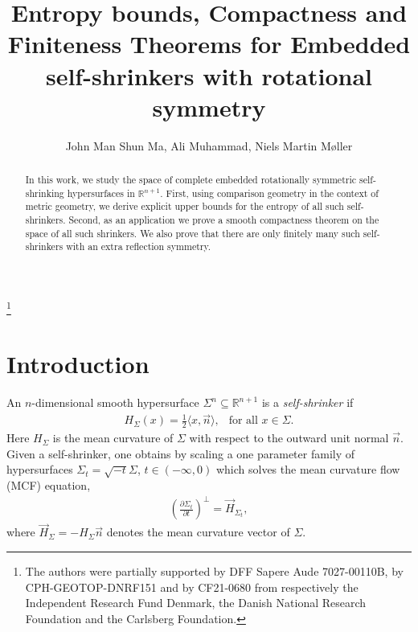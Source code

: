 \documentclass[12pt]{amsart}
\numberwithin{equation}{section}
\theoremstyle{remark}
\begin{document}
	
	\thanks{The authors were partially supported by DFF Sapere Aude 7027-00110B, by CPH-GEOTOP-DNRF151 and by CF21-0680 from respectively the Independent Research Fund Denmark, the Danish National Research Foundation and the Carlsberg Foundation.}
	
	
	
	
	\title[Embedded self-shrinkers with rotational symmetry]{Entropy bounds, Compactness and Finiteness Theorems for Embedded self-shrinkers with rotational symmetry}
	
	\author[J.M.S. Ma,  A. Muhammad, N.M. M\o ller]{John Man Shun Ma,  Ali Muhammad, Niels Martin M\o ller}
	
	
	\begin{abstract} In this work, we study the space of complete embedded rotationally symmetric self-shrinking hypersurfaces in $\mathbb{R}^{n+1}$. First, using comparison geometry in the context of metric geometry, we derive explicit upper bounds for the entropy of all such self-shrinkers. Second, as an application we prove a smooth compactness theorem on the space of all such shrinkers. We also prove that there are only finitely many such self-shrinkers with an extra reflection symmetry. 
	\end{abstract}
	
	\date{}
	
	\maketitle
	
	\section{Introduction}
	An $n$-dimensional smooth hypersurface $\Sigma^n\subseteq\mathbb R^{n+1}$ is a {\sl self-shrinker} if 
	\begin{align*}
		H_\Sigma(x) = \frac 12 \langle x, \vec n\rangle, \ \ \text{ for all }x\in \Sigma.
	\end{align*}
	Here $H_\Sigma$ is the mean curvature of $\Sigma$ with respect to the outward unit normal $\vec n$. Given a self-shrinker, one obtains by scaling a one parameter family of hypersurfaces $\Sigma_t = \sqrt{-t} \Sigma$, $t\in (-\infty, 0)$ which solves the mean curvature flow (MCF) equation,
	\begin{align} \label{MCF eqn}
		\left( \frac{\partial  \Sigma_t}{\partial t}\right)^\perp = \vec H_{\Sigma_t},
	\end{align}
	where $\vec H_\Sigma = -H_\Sigma\vec n$ denotes the mean curvature vector of $\Sigma$.
	
\end{document}
